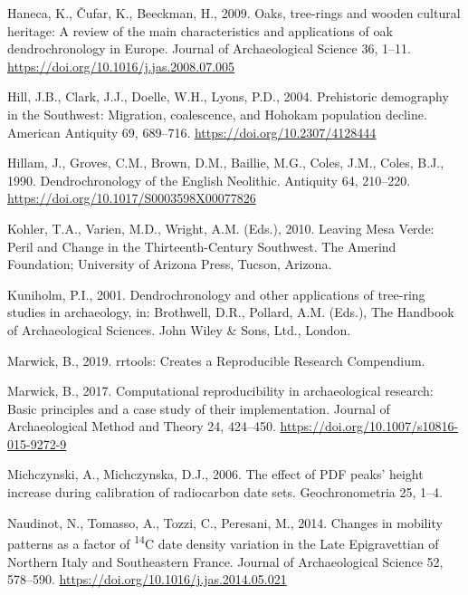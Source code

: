 \documentclass[
]{article}
\newlength{\cslhangindent}
\newenvironment{cslreferences}%
  {\setlength{\parindent}{0pt}%
  \everypar{\setlength{\hangindent}{\cslhangindent}}\ignorespaces}%
  {\par}
\begin{document}
\begin{cslreferences}
\leavevmode\hypertarget{ref-Haneca2009}{}%
Haneca, K., Čufar, K., Beeckman, H., 2009. Oaks, tree-rings and wooden cultural heritage: A review of the main characteristics and applications of oak dendrochronology in Europe. Journal of Archaeological Science 36, 1--11. \url{https://doi.org/10.1016/j.jas.2008.07.005}

\leavevmode\hypertarget{ref-Hill2004}{}%
Hill, J.B., Clark, J.J., Doelle, W.H., Lyons, P.D., 2004. Prehistoric demography in the Southwest: Migration, coalescence, and Hohokam population decline. American Antiquity 69, 689--716. \url{https://doi.org/10.2307/4128444}

\leavevmode\hypertarget{ref-Hillam1990}{}%
Hillam, J., Groves, C.M., Brown, D.M., Baillie, M.G., Coles, J.M., Coles, B.J., 1990. Dendrochronology of the English Neolithic. Antiquity 64, 210--220. \url{https://doi.org/10.1017/S0003598X00077826}

\leavevmode\hypertarget{ref-Kohler2010b}{}%
Kohler, T.A., Varien, M.D., Wright, A.M. (Eds.), 2010. Leaving Mesa Verde: Peril and Change in the Thirteenth-Century Southwest. The Amerind Foundation; University of Arizona Press, Tucson, Arizona.

\leavevmode\hypertarget{ref-Kuniholm2001}{}%
Kuniholm, P.I., 2001. Dendrochronology and other applications of tree-ring studies in archaeology, in: Brothwell, D.R., Pollard, A.M. (Eds.), The Handbook of Archaeological Sciences. John Wiley \& Sons, Ltd., London.

\leavevmode\hypertarget{ref-rrtools}{}%
Marwick, B., 2019. rrtools: Creates a Reproducible Research Compendium.

\leavevmode\hypertarget{ref-Marwick2017}{}%
Marwick, B., 2017. Computational reproducibility in archaeological research: Basic principles and a case study of their implementation. Journal of Archaeological Method and Theory 24, 424--450. \url{https://doi.org/10.1007/s10816-015-9272-9}

\leavevmode\hypertarget{ref-Michczynski2006}{}%
Michczynski, A., Michczynska, D.J., 2006. The effect of PDF peaks' height increase during calibration of radiocarbon date sets. Geochronometria 25, 1--4.

\leavevmode\hypertarget{ref-Naudinot2014}{}%
Naudinot, N., Tomasso, A., Tozzi, C., Peresani, M., 2014. Changes in mobility patterns as a factor of \textsuperscript{14}C date density variation in the Late Epigravettian of Northern Italy and Southeastern France. Journal of Archaeological Science 52, 578--590. \url{https://doi.org/10.1016/j.jas.2014.05.021}


\end{cslreferences}
\end{document}
